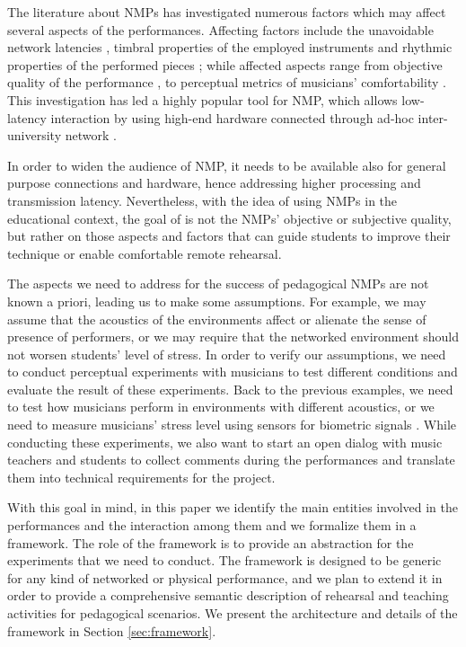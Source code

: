 \documentclass[conference]{IEEEtran}
\begin{document}
The literature about NMPs has investigated numerous factors which may affect several aspects of the performances. Affecting factors include the unavoidable network latencies \cite{Chafe1}, timbral properties of the employed instruments \cite{Kolazi2013} and rhythmic properties of the performed pieces \cite{RottondiFeature}; while affected aspects range from objective quality of the performance \cite{Chafe3}, to perceptual metrics of musicians' comfortability \cite{CIM2018}. This investigation has led a highly popular tool for NMP, which allows low-latency interaction by using high-end hardware connected through ad-hoc inter-university network \cite{drioli2013networked}. 

In order to widen the audience of NMP, it needs to be available also for general purpose connections and hardware, hence addressing higher processing and transmission latency. Nevertheless, with the idea of using NMPs in the educational context, the goal of is not the NMPs' objective or subjective quality, but rather on those aspects and factors that can guide students to improve their technique or enable comfortable remote rehearsal. 

The aspects we need to address for the success of pedagogical NMPs are not known a priori, leading us to make some assumptions. For example, we may assume that the acoustics of the environments affect or alienate the sense of presence of performers, or we may require that the networked environment should not worsen students' level of stress. In order to verify our assumptions, we need to conduct perceptual experiments with musicians to test different conditions and evaluate the result of these experiments. Back to the previous examples, we need to test how musicians perform in environments with different acoustics, or we need to measure musicians' stress level using sensors for biometric signals \cite{Yoshie2009}. While conducting these experiments, we also want to start an open dialog with music teachers and students to collect comments during the performances and translate them into technical requirements for the project. 

With this goal in mind, in this paper we identify the main entities involved in the performances and the interaction among them and we formalize them in a framework. The role of the framework is to provide an abstraction for the experiments that we need to conduct. The framework is designed to be generic for any kind of networked or physical performance, and we plan to extend it in order to provide a comprehensive semantic description of rehearsal and teaching activities for pedagogical scenarios. We present the architecture and details of the framework in Section \ref{sec:framework}.
\end{document}

